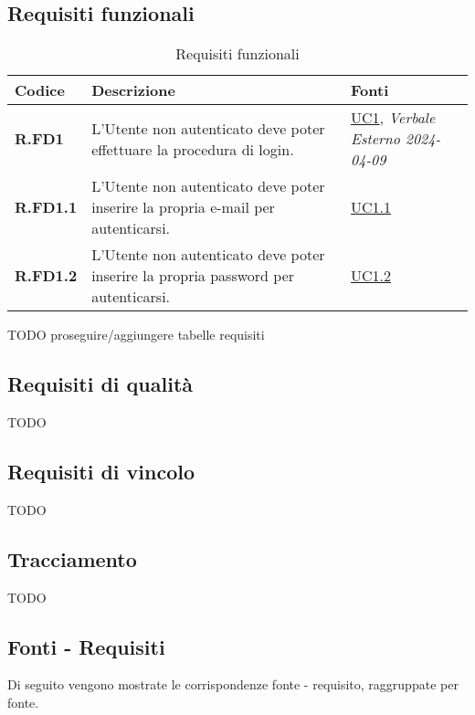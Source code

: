 \subsection{Requisiti funzionali}
\begin{table}[H]
\begin{center}
  \begin{longtable}{|P{3cm}|P{6,5cm}|>{\arraybackslash}P{4cm}|}
    \hline
    \textbf{Codice} & \textbf{Descrizione} & \textbf{Fonti} \\
    \hline 
    
    \textbf{R.FD1} & L’Utente non autenticato deve poter effettuare la procedura di login. &  \hyperref[UC1]{UC1}, \emph{Verbale Esterno 2024-04-09}\\
    \hline \textbf{R.FD1.1} & L’Utente non autenticato deve poter inserire la propria e-mail per autenticarsi. & \hyperref[UC1point1]{UC1.1}\\
    \hline \textbf{R.FD1.2} & L’Utente non autenticato deve poter inserire la propria password per autenticarsi. & \hyperref[UC1point2]{UC1.2}\\
    \hline
  \end{longtable}
\end{center}
\caption{Requisiti funzionali}
\label{requisitifunzionali}
\end{table}

TODO proseguire/aggiungere tabelle requisiti

\subsection{Requisiti di qualità}
TODO

\subsection{Requisiti di vincolo}
TODO

\subsection{Tracciamento}
TODO

\subsection{Fonti - Requisiti}
Di seguito vengono mostrate le corrispondenze fonte - requisito, raggruppate per fonte.

